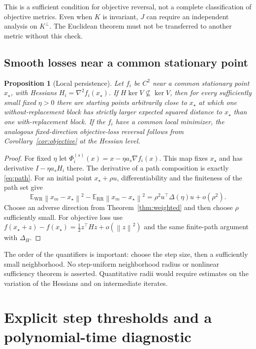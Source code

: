 \documentclass[11pt,letterpaper]{article}
\numberwithin{equation}{section}
\newtheorem{proposition}[theorem]{Proposition}
\theoremstyle{definition}
\newcommand{\E}{\mathbb E}
\newcommand{\WR}{\mathrm{WR}}
\newcommand{\RR}{\mathrm{RR}}
\newcommand{\norm}[1]{\left\lVert #1\right\rVert}
\begin{document}
This is a sufficient condition for objective reversal, not a complete classification of objective metrics. Even when $K$ is invariant, $J$ can require an independent analysis on $K^\perp$. The Euclidean theorem must not be transferred to another metric without this check.

\subsection{Smooth losses near a common stationary point}

\begin{proposition}[Local persistence]\label{prop:nonlinear}
Let $f_i$ be $C^2$ near a common stationary point $x_\star$, with Hessians $H_i=\nabla^2f_i(x_\star)$. If $H\ker V\not\subseteq\ker V$, then for every sufficiently small fixed $\eta>0$ there are starting points arbitrarily close to $x_\star$ at which one without-replacement block has strictly larger expected squared distance to $x_\star$ than one with-replacement block. If the $f_i$ have a common local minimizer, the analogous fixed-direction objective-loss reversal follows from Corollary~\ref{cor:objective} at the Hessian level.
\end{proposition}
\begin{proof}
For fixed $\eta$ let $\Phi_i^{(s)}(x)=x-\eta a_s\nabla f_i(x)$. This map fixes $x_\star$ and has derivative $I-\eta a_sH_i$ there. The derivative of a path composition is exactly \eqref{eq:path}. For an initial point $x_\star+\rho u$, differentiability and the finiteness of the path set give
\[
 \E_{\WR}\norm{x_m-x_\star}^2-
 \E_{\RR}\norm{x_m-x_\star}^2
 =\rho^2u^\top\Delta(\eta)u+o(\rho^2).
\]
Choose an adverse direction from Theorem~\ref{thm:weighted} and then choose $\rho$ sufficiently small. For objective loss use
$f(x_\star+z)-f(x_\star)=\tfrac12z^\top Hz+o(\norm z^2)$
and the same finite-path argument with $\Delta_H$.
\end{proof}

The order of the quantifiers is important: choose the step size, then a sufficiently small neighborhood. No step-uniform neighborhood radius or nonlinear sufficiency theorem is asserted. Quantitative radii would require estimates on the variation of the Hessians and on intermediate iterates.

\section{Explicit step thresholds and a polynomial-time diagnostic}
\label{sec:algorithm}
\end{document}
